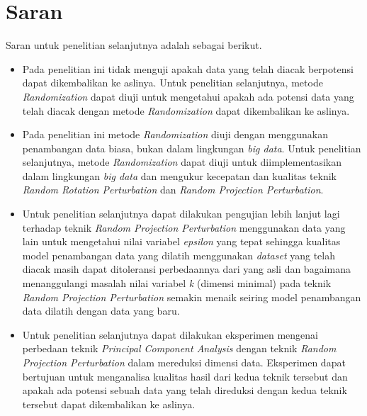 \section{Saran}
\label{sec:saran}

Saran untuk penelitian selanjutnya adalah sebagai berikut.
\begin{itemize}
    \item Pada penelitian ini tidak menguji apakah data yang telah diacak berpotensi dapat dikembalikan ke aslinya. Untuk penelitian selanjutnya, metode \textit{Randomization} dapat diuji untuk mengetahui apakah ada potensi data yang telah diacak dengan metode \textit{Randomization} dapat dikembalikan ke aslinya.
    \item Pada penelitian ini metode \textit{Randomization} diuji dengan menggunakan penambangan data biasa, bukan dalam lingkungan \textit{big data}. Untuk penelitian selanjutnya, metode \textit{Randomization} dapat diuji untuk diimplementasikan dalam lingkungan \textit{big data} dan mengukur kecepatan dan kualitas teknik \textit{Random Rotation Perturbation} dan \textit{Random Projection Perturbation}.
    \item Untuk penelitian selanjutnya dapat dilakukan pengujian lebih lanjut lagi terhadap teknik \textit{Random Projection Perturbation} menggunakan data yang lain untuk mengetahui nilai variabel \textit{epsilon} yang tepat sehingga kualitas model penambangan data yang dilatih menggunakan \textit{dataset} yang telah diacak masih dapat ditoleransi perbedaannya dari yang asli dan bagaimana menanggulangi masalah nilai variabel \textit{k} (dimensi minimal) pada teknik \textit{Random Projection Perturbation} semakin menaik seiring model penambangan data dilatih dengan data yang baru.
    \item Untuk penelitian selanjutnya dapat dilakukan eksperimen mengenai perbedaan teknik \textit{Principal Component Analysis} dengan teknik \textit{Random Projection Perturbation} dalam mereduksi dimensi data. Eksperimen dapat bertujuan untuk menganalisa kualitas hasil dari kedua teknik tersebut dan apakah ada potensi sebuah data yang telah direduksi dengan kedua teknik tersebut dapat dikembalikan ke aslinya.
\end{itemize}

